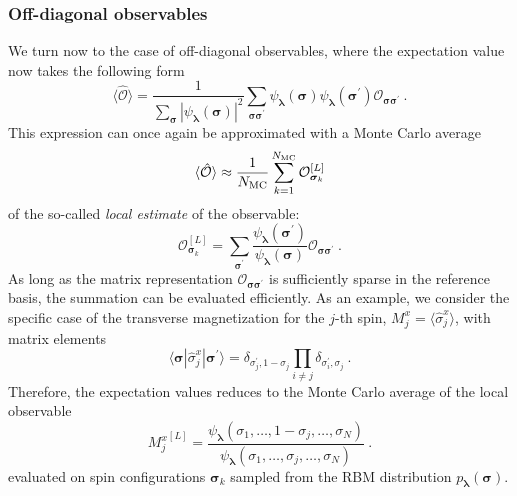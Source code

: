 \documentclass[submission, Phys, hidelnks]{SciPost}
\begin{document}
\subsubsection{Off-diagonal observables}
We turn now to the case of off-diagonal observables, where the expectation value now takes the following form
\begin{equation}
    \langle \hat{\mathcal{O}} \rangle = \frac{1}{\sum_{\bm{\sigma}} |\psi_{\bm{\lambda}}(\bm{\sigma})|^2}
    \sum_{\bm{\sigma\sigma}^\prime} \psi_{\bm{\lambda}}(\bm{\sigma})
    \psi_{\bm{\lambda}}(\bm{\sigma}^\prime)\mathcal{O}_{\bm{\sigma\sigma}^\prime}\:.
\end{equation}
This expression can once again be approximated with a Monte Carlo average 
\begin{equation}
    \langle \hat{\mathcal{O}}\rangle \approx \frac{1}{N_{\rm MC}} \sum_{k=1}^{N_{\rm MC}} \mathcal{O}^{[L]}_{\bm{\sigma}_k}
\end{equation}
of the so-called \emph{local estimate} of the observable: 
\begin{equation}
    \mathcal{O}^{[L]}_{\bm{\sigma}_k}=\sum_{\bm{\sigma}^\prime}\frac{\psi_{\bm{\lambda}}(\bm{\sigma}^\prime)}{\psi_{\bm{\lambda}}(\bm{\sigma})} \mathcal{O}_{\bm{\sigma\sigma}^\prime}\:.
\end{equation}
As long as the matrix representation $\mathcal{O}_{\bm{\sigma\sigma}^\prime}$ is sufficiently sparse in the reference basis, the summation can be evaluated efficiently. As an example, we consider the specific case of the transverse magnetization for the $j$-th spin, $M_j^x=\langle\hat{\sigma}^x_j\rangle$, with matrix elements
\begin{equation}
    \langle\bm{\sigma}|\hat{\sigma}^x_j|\bm{\sigma}^{\prime}\rangle=\delta_{\sigma_j^\prime,1-\sigma_j}\prod_{i\ne j}\delta_{\sigma_i^\prime,\sigma_j}\:.
\end{equation}
Therefore, the expectation values reduces to the Monte Carlo average of the local observable
\begin{equation}
    {M_j^x}^{[L]}=\frac{\psi_{\bm{\lambda}}(\sigma_1,\dots,1-\sigma_j,\dots,\sigma_N)}
    {\psi_{\bm{\lambda}}(\sigma_1,\dots,\sigma_j,\dots,\sigma_N)} 
\:.
\end{equation}
evaluated on spin configurations $\bm{\sigma}_k$ sampled from the RBM distribution $p_{\bm{\lambda}}(\bm{\sigma})$. 
\end{document}
